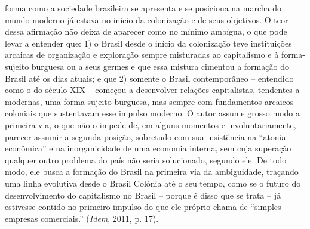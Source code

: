 forma como a sociedade brasileira se apresenta e se posiciona na marcha
do mundo moderno já estava no início da colonização e de seus objetivos.
O teor dessa afirmação não deixa de aparecer como no mínimo ambígua, o
que pode levar a entender que: 1) o Brasil desde o início da colonização
teve instituições arcaicas de organização e exploração sempre misturadas
ao capitalismo e à forma-sujeito burguesa ou a seus germes e que essa
mistura cimentou a formação do Brasil até os dias atuais; e que 2)
somente o Brasil contemporâneo -- entendido como o do século XIX --
começou a desenvolver relações capitalistas, tendentes a modernas, uma
forma-sujeito burguesa, mas sempre com fundamentos arcaicos coloniais
que sustentavam esse impulso moderno. O autor assume grosso modo a
primeira via, o que não o impede de, em alguns momentos e
involuntariamente, parecer assumir a segunda posição, sobretudo com sua
insistência na ``atonia econômica'' e na inorganicidade de uma economia
interna, sem cuja superação qualquer outro problema do país não seria
solucionado, segundo ele. De todo modo, ele busca a formação do Brasil
na primeira via da ambiguidade, traçando uma linha evolutiva desde o
Brasil Colônia até o seu tempo, como se o futuro do desenvolvimento do
capitalismo no Brasil -- porque é disso que se trata -- já estivesse
contido no primeiro impulso do que ele próprio chama de ``simples
empresas comerciais.'' (\emph{Idem}, 2011, p. 17).

